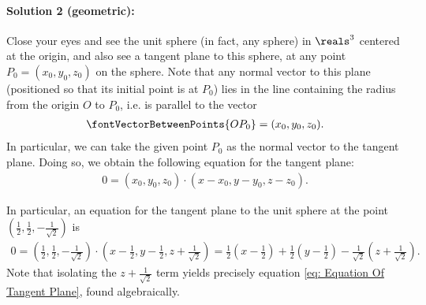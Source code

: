 {\paragraph{Solution 2 (geometric):}

Close your eyes and see the unit sphere (in fact, any sphere) in $\reals^{3}$ centered at the origin, and also see a tangent plane to this sphere, at any point $P_{0} = (x_{0},y_{0},z_{0})$ on the sphere. Note that any normal vector to this plane (positioned so that its initial point is at $P_{0}$) lies in the line containing the radius from the origin $O$ to $P_{0}$, i.e. is parallel to the vector
\begin{align*}
\fontVectorBetweenPoints{O P_{0}}
=
(x_{0},y_{0},z_{0}).
\end{align*}
In particular, we can take the given point $P_{0}$ as the normal vector to the tangent plane. Doing so, we obtain the following equation for the tangent plane:
\begin{align*}
0
=
\left(x_{0},y_{0},z_{0}\right) \cdot \left(x - x_{0},y - y_{0},z - z_{0}\right).
\end{align*}

In particular, an equation for the tangent plane to the unit sphere at the point $(\frac{1}{2},\frac{1}{2},-\frac{1}{\sqrt{2}})$ is
\begin{align*}
0
=
\left(\frac{1}{2},\frac{1}{2},-\frac{1}{\sqrt{2}}\right) \cdot \left(x - \frac{1}{2},y - \frac{1}{2},z + \frac{1}{\sqrt{2}}\right)
=
\frac{1}{2} \left(x - \frac{1}{2}\right) + \frac{1}{2} \left(y - \frac{1}{2}\right) - \frac{1}{\sqrt{2}} \left(z + \frac{1}{\sqrt{2}}\right).
\end{align*}
Note that isolating the $z + \frac{1}{\sqrt{2}}$ term yields precisely equation \eqref{eq: Equation Of Tangent Plane}, found algebraically.
}%